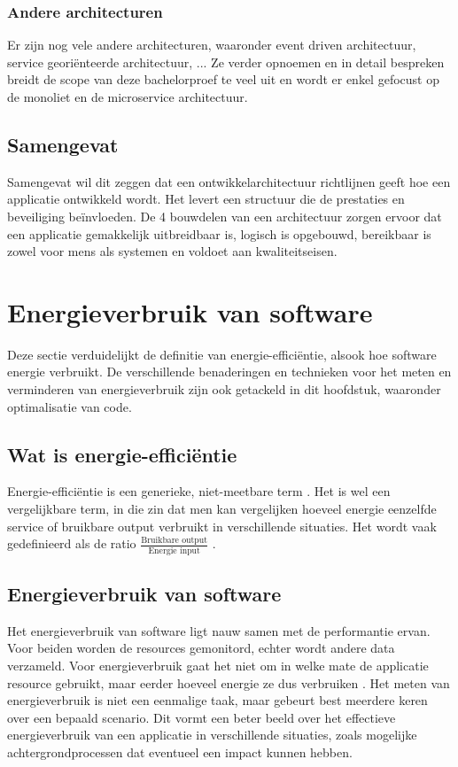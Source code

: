 \subsubsection{Andere architecturen}
Er zijn nog vele andere architecturen, waaronder event driven architectuur, service georiënteerde architectuur, ... Ze verder opnoemen en in detail bespreken breidt de scope van deze bachelorproef te veel uit en wordt er enkel gefocust op de monoliet en de microservice architectuur. 

\subsection{Samengevat}
Samengevat wil dit zeggen dat een ontwikkelarchitectuur richtlijnen geeft hoe een applicatie ontwikkeld wordt. Het levert een structuur die de prestaties en beveiliging beïnvloeden. De 4 bouwdelen van een architectuur zorgen ervoor dat een applicatie gemakkelijk uitbreidbaar is, logisch is opgebouwd, bereikbaar is zowel voor mens als systemen en voldoet aan kwaliteitseisen.



\section{Energieverbruik van software}
Deze sectie verduidelijkt de definitie van energie-efficiëntie, alsook hoe software energie verbruikt. De verschillende benaderingen en technieken voor het meten en verminderen van energieverbruik zijn ook getackeld in dit hoofdstuk, waaronder optimalisatie van code.

\subsection{Wat is energie-efficiëntie}
Energie-efficiëntie is een generieke, niet-meetbare term \autocite{Patterson1996}. Het is wel een vergelijkbare term, in die zin dat men kan vergelijken hoeveel energie eenzelfde service of bruikbare output verbruikt in verschillende situaties. Het wordt vaak gedefinieerd als de ratio 
$\frac{\text{Bruikbare output}}{\text{Energie input}}$ .



\subsection{Energieverbruik van software}
Het energieverbruik van software ligt nauw samen met de performantie ervan. Voor beiden worden de resources gemonitord, echter wordt andere data verzameld. Voor energieverbruik gaat het niet om in welke mate de applicatie resource gebruikt, maar eerder hoeveel energie ze dus verbruiken \autocite{Kor2015}. Het meten van energieverbruik is niet een eenmalige taak, maar gebeurt best meerdere keren over een bepaald scenario. Dit vormt een beter beeld over het effectieve energieverbruik van een applicatie in verschillende situaties, zoals mogelijke achtergrondprocessen dat eventueel een impact kunnen hebben.


